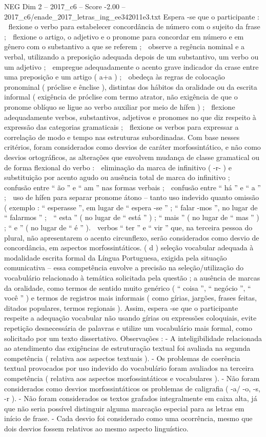 \begin{textsample}{NEG Dim 2 – 2017\_c6 – Score -2.00 – 2017\_c6/enade\_2017\_letras\_ing\_ee342011e3.txt}
Espera -se que o participante :  flexione o verbo para estabelecer concordância de número com o sujeito da frase ;  flexione o artigo, o adjetivo e o pronome para concordar em número e em gênero com o substantivo a que se referem ;  observe a regência nominal e a verbal, utilizando a preposição adequada depois de um substantivo, um verbo ou um adjetivo ;  empregue adequadamente o acento grave indicador da crase entre uma preposição e um artigo ( a+a ) ;  obedeça às regras de colocação pronominal ( próclise e ênclise ), distintas dos hábitos da oralidade ou da escrita informal ( exigência de próclise com termo atrator, não exigência de que o pronome oblíquo se ligue ao verbo auxiliar por meio de hífen ) ;  flexione adequadamente verbos, substantivos, adjetivos e pronomes no que diz respeito à expressão das categorias gramaticais ;  flexione os verbos para expressar a correlação de modo e tempo nas estruturas subordinadas.
Com base nesses critérios, foram considerados como desvios de caráter morfossintático, e não como desvios ortográficos, as alterações que envolvem mudança de classe gramatical ou de forma flexional do verbo :  eliminação da marca de infinitivo ( -r- ) e substituição por acento agudo ou ausência total de marca do infinitivo ;  confusão entre “ ão ” e “ am ” nas formas verbais ;  confusão entre “ há ” e “ a ” ;  uso de hífen para separar pronome átono – tanto uso indevido quanto omissão ( exemplo : “ esperasse ”, em lugar de “ espera -se ” ; “ falar -mos ”, no lugar de “ falarmos ” ;  “ esta ” ( no lugar de “ está ” ) ; “ mais ” ( no lugar de “ mas ” ) ; “ e ” ( no lugar de “ é ” ).  verbos “ ter ” e “ vir ” que, na terceira pessoa do plural, não apresentarem o acento circunflexo, serão considerados como desvio de concordância, em aspectos morfossintáticos. ( d ) seleção vocabular adequada à modalidade escrita formal da Língua Portuguesa, exigida pela situação comunicativa – essa competência envolve a precisão na seleção/utilização do vocabulário relacionado à temática solicitada pela questão ; a ausência de marcas da oralidade, como termos de sentido muito genérico ( “ coisa ”, “ negócio ”, “ você ” ) e termos de registros mais informais ( como gírias, jargões, frases feitas, ditados populares, termos regionais ).
Assim, espera -se que o participante respeite a adequação vocabular não usando gírias ou expressões coloquiais, evite repetição desnecessária de palavras e utilize um vocabulário mais formal, como solicitado por um texto dissertativo.
Observações : - A inteligibilidade relacionada ao atendimento das exigências de estruturação textual foi avaliada na segunda competência ( relativa aos aspectos textuais ). - Os problemas de coerência textual provocados por uso indevido do vocabulário foram avaliados na terceira competência ( relativa aos aspectos morfossintáticos e vocabulares ). - Não foram considerados como desvios morfossintáticos os problemas de caligrafia ( -a/ -o, -s, -r ). - Não foram considerados os textos grafados integralmente em caixa alta, já que não seria possível distinguir alguma marcação especial para as letras em início de frase. - Cada desvio foi considerado como uma ocorrência, mesmo que dois desvios fossem relativos ao mesmo aspecto linguístico.

\end{textsample}

